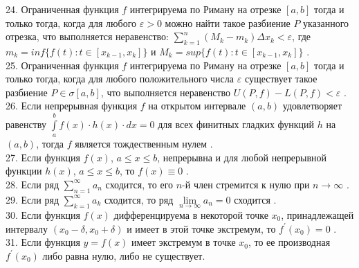 \documentclass[12pt]{article}
\begin{document}
24. Ограниченная функция ${\displaystyle f}$ интегрируема по Риману на отрезке ${\displaystyle [a,b]}$ тогда и только тогда, когда для любого ${\displaystyle \varepsilon>0}$ можно найти такое разбиение ${\displaystyle P}$ указанного отрезка, что выполняется неравенство: ${\displaystyle \sum \limits _{k=1}^{n} (M_k-m_k)\Delta x_k<\varepsilon}$, где ${\displaystyle m_k=inf \{f(t):t\in[x_{k-1},x_k]\}}$ и ${\displaystyle M_k=sup \{f(t):t\in[x_{k-1},x_k]\}}$ .\\

25. Ограниченная функция ${\displaystyle f}$  интегрируема по Риману на отрезке ${\displaystyle [a,b]}$ тогда и только тогда, когда для любого положительного числа ${\displaystyle \varepsilon}$ существует такое разбиение ${\displaystyle P\in \sigma[a,b]}$, что выполняется неравенство ${\displaystyle U(P,f) - L(P,f) < \varepsilon}$ .\\

26. Если непрерывная функция ${\displaystyle f}$ на открытом интервале ${\displaystyle (a,b)}$ удовлетворяет равенству ${\displaystyle \int \limits _{a}^{b}f(x)\cdot h(x)\cdot dx=0}$ для всех финитных гладких функций ${\displaystyle h}$ на ${\displaystyle (a,b)}$, тогда ${\displaystyle f}$ является тождественным нулем .\\

27. Если функция  ${\displaystyle f(x)}$,  ${\displaystyle a \leq x \leq b}$, непрерывна и для любой непрерывной функции  ${\displaystyle h(x)}$, ${\displaystyle a \leq x \leq b}$, то  ${\displaystyle f(x) \equiv 0}$ .\\

28. Если ряд ${\displaystyle \sum \limits _{n=1}^{\infty} a_n}$ сходится, то его ${\displaystyle n}$-й член стремится к нулю при ${\displaystyle n \to \infty}$ .\\

29. Если ряд ${\displaystyle \sum \limits _{k=1}^{\infty} a_k}$ сходится, то ряд ${\displaystyle \lim \limits _{n \to \infty} a_n=0}$ сходится .\\

30. Если функция ${\displaystyle f(x)}$ дифференцируема в некоторой точке  ${\displaystyle x_0}$, принадлежащей интервалу ${\displaystyle (x_0-\delta,x_0+\delta)}$ и имеет в этой точке экстремум, то ${\displaystyle f^{\prime}(x_0)=0}$ .\\

31. Если функция ${\displaystyle y=f(x)}$ имеет экстремум в точке ${\displaystyle x_0}$, то ее производная ${\displaystyle f^{\prime}(x_0)}$ либо равна нулю, либо не существует.\\
\end{document}
